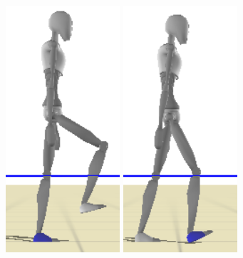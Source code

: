 \documentclass[conference]{acmsiggraph}
\begin{document}
\begin{figure}[t]
\includegraphics[scale=0.17]{images/strips/0_5/7.png}
\includegraphics[scale=0.17]{images/strips/0_5/8.png}


\end{figure}
\end{document}
